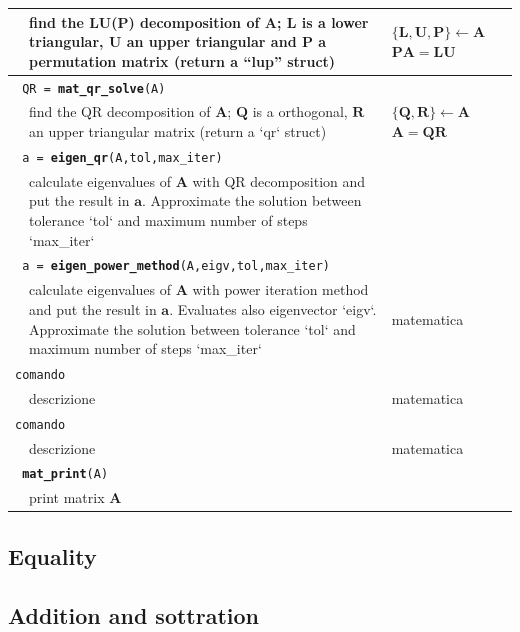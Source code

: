 \documentclass[10pt]{article}
\begin{document}
\begin{longtable}{@{} p{1.5cm} p{7cm} p{3cm} @{}}
& find the LU(P) decomposition of $\mathbf{A}$; $\mathbf{L}$ is a lower triangular, $\mathbf{U}$ an upper triangular and $\mathbf{P}$ a permutation matrix (return a ``lup'' struct) &
$\{\mathbf{L},\mathbf{U},\mathbf{P}\}\gets\mathbf{A}\quad$ $\mathbf{P}\mathbf{A}=\mathbf{L}\mathbf{U}$ \\
\hline
\multicolumn{2}{l}{\texttt{ QR = \textbf{mat\_qr\_solve}(A) }} \\
& find the QR decomposition of $\mathbf{A}$; $\mathbf{Q}$ is a orthogonal, $\mathbf{R}$ an upper triangular matrix (return a `qr` struct) &
$\{\mathbf{Q},\mathbf{R}\}\gets\mathbf{A}\quad$ $\mathbf{A}=\mathbf{Q}\mathbf{R}$ \\
\hline
\multicolumn{2}{l}{\texttt{ a = \textbf{eigen\_qr}(A,tol,max\_iter) }} \\
& calculate eigenvalues of $\mathbf{A}$ with QR decomposition and put the result in $\mathbf{a}$. Approximate the solution between tolerance `tol` and maximum number of steps `max\_iter` & \\
\hline
\multicolumn{2}{l}{\texttt{ a = \textbf{eigen\_power\_method}(A,eigv,tol,max\_iter) }} \\
& calculate eigenvalues of $\mathbf{A}$ with power iteration method and put the result in $\mathbf{a}$. Evaluates also eigenvector `eigv`. Approximate the solution between tolerance `tol` and maximum number of steps `max\_iter` &
matematica \\
\hline
\multicolumn{2}{l}{\texttt{comando}} \\
& descrizione &
matematica \\
\hline
\multicolumn{2}{l}{\texttt{comando}} \\
& descrizione &
matematica \\


\hline
\multicolumn{2}{l}{\texttt{ \textbf{mat\_print}(A) }} \\
& print matrix $\mathbf{A}$ & \\




\bottomrule

\end{longtable}


\subsection{Equality}

\subsection{Addition and sottration}
\end{document}
